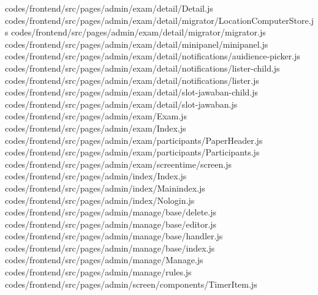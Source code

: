 codes/frontend/src/pages/admin/exam/detail/Detail.js
codes/frontend/src/pages/admin/exam/detail/migrator/LocationComputerStore.js
codes/frontend/src/pages/admin/exam/detail/migrator/migrator.js
codes/frontend/src/pages/admin/exam/detail/minipanel/minipanel.js
codes/frontend/src/pages/admin/exam/detail/notifications/auidience-picker.js
codes/frontend/src/pages/admin/exam/detail/notifications/lister-child.js
codes/frontend/src/pages/admin/exam/detail/notifications/lister.js
codes/frontend/src/pages/admin/exam/detail/slot-jawaban-child.js
codes/frontend/src/pages/admin/exam/detail/slot-jawaban.js
codes/frontend/src/pages/admin/exam/Exam.js
codes/frontend/src/pages/admin/exam/Index.js
codes/frontend/src/pages/admin/exam/participants/PaperHeader.js
codes/frontend/src/pages/admin/exam/participants/Participants.js
codes/frontend/src/pages/admin/exam/screentime/screen.js
codes/frontend/src/pages/admin/index/Index.js
codes/frontend/src/pages/admin/index/Mainindex.js
codes/frontend/src/pages/admin/index/Nologin.js
codes/frontend/src/pages/admin/manage/base/delete.js
codes/frontend/src/pages/admin/manage/base/editor.js
codes/frontend/src/pages/admin/manage/base/handler.js
codes/frontend/src/pages/admin/manage/base/index.js
codes/frontend/src/pages/admin/manage/Manage.js
codes/frontend/src/pages/admin/manage/rules.js
codes/frontend/src/pages/admin/screen/components/TimerItem.js
